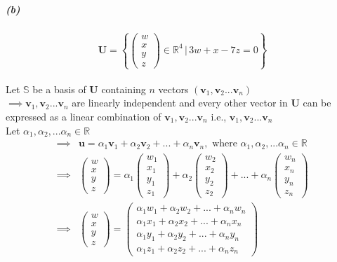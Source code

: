 \documentclass[12pt, letterpaper]{article}
\begin{document}
\subparagraph{(b)}
\[
  \mathbf{U} = \left\{
  \begin{pmatrix}w\\x\\y\\z\end{pmatrix}\in\mathbb{R}^4 \,|\, 3w + x -7z = 0
  \right\}
\]\\
Let $\mathbb{S}$ be a basis of $\mathbf{U}$ containing $n$ vectors $(\mathbf{v}_1,\mathbf{v}_2... \mathbf{v}_n)$\\

$\implies \mathbf{v}_1,\mathbf{v}_2... \mathbf{v}_n$ are linearly independent and every other vector in $\mathbf{U}$
can be expressed as a linear combination of $\mathbf{v}_1,\mathbf{v}_2... \mathbf{v}_n$ i.e., $\mathbf{v}_1,\mathbf{v}_2... \mathbf{v}_n$\\
Let $\alpha_1,\alpha_2,...\alpha_n \in \mathbb{R}$
\[
\begin{split}
\implies &\mathbf{u} = \alpha_1 \mathbf{v}_1 + \alpha_2 \mathbf{v}_2 + ... + \alpha_n \mathbf{v}_n,
\text{ where }\alpha_1,\alpha_2,...\alpha_n \in \mathbb{R}\\
\implies &\begin{pmatrix} w\\x\\y\\z \end{pmatrix}
= \alpha_1 \begin{pmatrix} w_1\\x_1\\y_1\\z_1 \end{pmatrix}  + \alpha_2 \begin{pmatrix} w_2\\x_2\\y_2\\z_2 \end{pmatrix} + ... + \alpha_n \begin{pmatrix} w_n\\x_n\\y_n\\z_n \end{pmatrix}\\
\implies &\begin{pmatrix} w\\x\\y\\z \end{pmatrix}
= \begin{pmatrix}
  \alpha_1 w_1 + \alpha_2 w_2 + ... + \alpha_n w_n\\
  \alpha_1 x_1 + \alpha_2 x_2 + ... + \alpha_n x_n\\
  \alpha_1 y_1 + \alpha_2 y_2 + ... + \alpha_n y_n\\
  \alpha_1 z_1 + \alpha_2 z_2 + ... + \alpha_n z_n
\end{pmatrix}
\end{split}
\]
\end{document}
